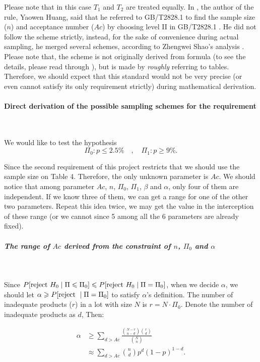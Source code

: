 \documentclass[conf]{new-aiaa}
\begin{document}
Please note that in this case $T_1$ and $T_2$ are treated equally. In \cite{jf4}, the author of the rule, Yaowen Huang, said that he referred to GB/T2828.1 \cite{GBT} to find the sample size ($n$) and acceptance number ($Ac$) by choosing level II in GB/T2828.1 \cite{jf4}. He did not follow the scheme strictly, instead, for the sake of convenience during actual sampling, he merged several schemes, according to Zhengwei Shao's analysis \cite{szw}. Please note that, the scheme is not originally derived from formula (to see the details, please read through \cite{jf4}), but is made by \emph{roughly} referring to tables. Therefore, we should expect that this standard would not be very precise (or even cannot satisfy its only requirement strictly) during mathematical derivation.

\paragraph{Direct derivation of the possible sampling schemes for the requirement}\ \medskip

We would like to test the hypothesis
$$
    \Pi_0: p\leqslant 2.5\% \quad,\quad \Pi_1: p\geqslant 9\%.
$$

Since the second requirement of this project restricts that we should use the sample size on Table 4. Therefore, the only unknown parameter is $Ac$. We should notice that among parameter $Ac$, $n$, $\Pi_0$, $\Pi_1$, $\beta$ and $\alpha$, only four of them are independent\cite{lhf}. If we know three of them, we can get a range for one of the other two parameters. Repeat this idea twice, we may get the value in the interception of these range (or we cannot since 5 among all the 6 parameters are already fixed).

\subparagraph{The range of $Ac$ derived from the constraint of $n$, $\Pi_0$ and $\alpha$}\label{ra}\ \medskip

Since $P[{\rm reject\ } H_0 \mid \Pi \leqslant \Pi_0] \leqslant P[{\rm reject\ } H_0 \mid \Pi = \Pi_0]$, when we decide $\alpha$, we should let $\alpha \geqslant P[{\rm reject\ } \mid \Pi = \Pi_0] $ to satisfy $\alpha$'s definition. The number of inadequate products ($r$) in a lot with size $N$ is $r = N \cdot \Pi_0$. Denote the number of inadequate products as $d$, Then:

\begin{align*}
    \alpha & \geqslant \sum_{d > Ac} \frac{\binom{N - r}{n - d}\binom{r}{d}}{\binom{N}{n}}\\
    &\approx \sum_{d > Ac} \binom{n}{d}p^{d}(1-p)^{1-d}.
\end{align*}
\end{document}
